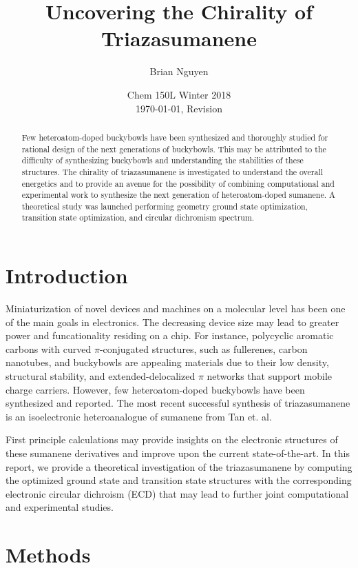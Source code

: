 \documentclass[11pt]{article}
\title{\textbf{Uncovering the Chirality of Triazasumanene}}
\author{Brian Nguyen}
\date{Chem 150L Winter 2018 \\ \today, Revision \Revision}
\begin{document}
\maketitle

\begin{abstract}
  \noindent Few heteroatom-doped buckybowls have been synthesized and
  thoroughly studied for rational design of the next generations of buckybowls.
  This may be attributed to the difficulty of synthesizing buckybowls and
  understanding the stabilities of these structures. The chirality of
  triazasumanene is investigated to understand the overall energetics and
  to provide an avenue for the possibility of combining computational and
  experimental work to synthesize the next generation of heteroatom-doped
  sumanene. A theoretical study was launched performing geometry ground state
  optimization, transition state optimization, and circular dichromism
  spectrum.
\end{abstract}

\section{Introduction}

Miniaturization of novel devices and machines on a molecular level
has been one of the main goals in electronics\cite{Vincenzo}. The decreasing
device size may lead to greater power and funcationality residing on
a chip. For instance, polycyclic aromatic carbons with curved $\pi$-conjugated
structures, such as fullerenes, carbon nanotubes, and buckybowls
are appealing materials due to their low density, structural stability,
and extended-delocalized $\pi$ networks that support mobile charge
carriers\cite{Laura}. However, few heteroatom-doped buckybowls
have been synthesized and reported. The most recent successful
synthesis of triazasumanene is an isoelectronic heteroanalogue
of sumanene from Tan et. al.\cite{doi:10.1246/bcsj.20170384}

First principle calculations may provide insights on the electronic
structures of these sumanene derivatives and improve upon the
current state-of-the-art. In this report, we provide a theoretical
investigation of the triazasumanene by computing the optimized
ground state and transition state structures with the corresponding
electronic circular dichroism (ECD) that may lead to further
joint computational and experimental studies.

\section{Methods}
\end{document}
